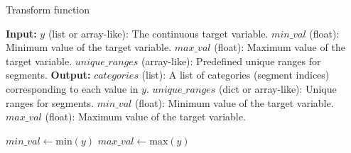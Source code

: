 \documentclass[a4paper, 12pt]{report}
\begin{document}
\begin{algorithm}
    \caption{Transform function}
    \begin{algorithmic}[1]
        \State \textbf{Input:} 
        \State $y$ (list or array-like): The continuous target variable.
        \State $min\_val$ (float): Minimum value of the target variable.
        \State $max\_val$ (float): Maximum value of the target variable.
        \State $unique\_ranges$ (array-like): Predefined unique ranges for segments.
        \State \textbf{Output:}
        \State $categories$ (list): A list of categories (segment indices) corresponding to each value in $y$.
        \State $unique\_ranges$ (dict or array-like): Unique ranges for segments.
        \State $min\_val$ (float): Minimum value of the target variable.
        \State $max\_val$ (float): Maximum value of the target variable.
        
            \State $min\_val \gets \text{min}(y)$
            \State $max\_val \gets \text{max}(y)$
        \EndIf
        

\end{algorithmic}
\end{algorithm}
\end{document}
